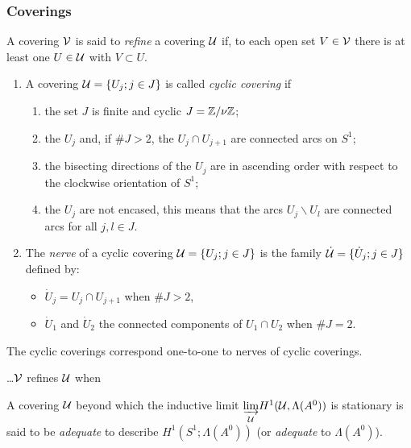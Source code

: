 \subsubsection{Coverings}
\begin{comment}
  \cite[Sec.II.1]{Loday1994} and \cite[Sec.II.3.1]{Loday1994}
\end{comment}
A covering $\mathcal{V}$ is said to \emph{refine} a covering $\mathcal{U}$ if, to each open set
$V\in\mathcal{V}$ there is at least one $U\in\mathcal{U}$ with $V\subset U$.
\begin{defn}
  \begin{enumerate}
    \item A covering $\mathcal{U}=\{U_j;j\in J\}$ is called \emph{cyclic covering} if
      \begin{enumerate}
        \item the set $J$ is finite and cyclic $J=\mathbb{Z}/\nu\mathbb{Z}$;
        \item the $U_j$ and, if $\#J>2$, the $U_j\cap U_{j+1}$ are connected
          arcs on $S^1$;
        \item the bisecting directions of the $U_j$ are in ascending order with
          respect to the clockwise orientation of $S^1$;
        \item the $U_j$ are not encased, this means that the arcs
          $U_j\backslash U_l$ are connected arcs for all $j,l\in J$.
      \end{enumerate}
    \item The \emph{nerve} of a cyclic covering $\mathcal{U}=\{U_j;j\in J\}$ is the
      family $\dot{\mathcal{U}}=\{\dot U_j;j\in J\}$ defined by:
      \begin{itemize}
        \item $\dot U_j=U_j\cap U_{j+1}$ when $\#J>2$,
        \item $\dot U_1$ and $\dot U_2$ the connected components of
          $U_1\cap U_2$ when $\#J=2$.
      \end{itemize}
  \end{enumerate}
\end{defn}
The cyclic coverings correspond one-to-one to nerves of cyclic coverings.
\begin{prop}
  \dots $\mathcal{V}$ refines $\mathcal{U}$ when \TODO{}
\end{prop}

\begin{defn}
  A covering $\mathcal{U}$ beyond which the inductive limit
  $\underset{\mathcal{U}}{\underrightarrow{\lim}}H^1(\mathcal{U},\Lambda(A^0))$ is stationary
  is said to be \emph{adequate} to describe $H^1(S^1;\Lambda(A^0))$ (or
  \emph{adequate} to $\Lambda(A^0)$).
\end{defn}

